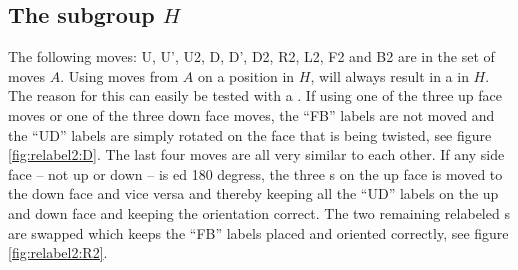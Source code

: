 \subsection{The subgroup $H$}
\label{sub:theSubgroupH}
The following moves: U, U', U2, D, D', D2, R2, L2, F2 and B2 are in the set of moves $A$. Using moves from $A$ on a position in $H$, will always result in a \rubik{} in $H$. The reason for this can easily be tested with a \rubik{}. If using one of the three up face moves or one of the three down face moves, the ``FB'' labels are not moved and the ``UD'' labels are simply rotated on the face that is being twisted, see figure \ref{fig:relabel2:D}. The last four moves are all very similar to each other. If any side face -- not up or down -- is \twist{}ed 180 degress, the three \facelet{}s on the up face is moved to the down face and vice versa and thereby keeping all the ``UD'' labels on the up and down face and keeping the orientation correct. The two remaining relabeled \facelet{}s are swapped which keeps the ``FB'' labels placed and oriented correctly, see figure \ref{fig:relabel2:R2}.


\begin{figure}[!hb]
	\centering
	\hspace{0.05\textwidth}
	\caption{}
	\label{fig:relabel2}
\end{figure}
